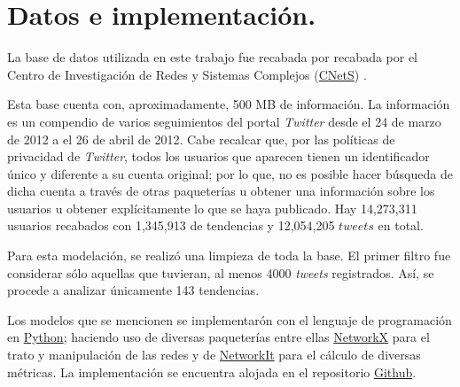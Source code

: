 \documentclass[../main.tex]{subfiles}
\begin{document}
\section{Datos e implementación.}

La base de datos utilizada en este trabajo fue recabada por recabada por el Centro de Investigación de Redes y Sistemas Complejos (\href{https://cnets.indiana.edu/about/}{CNetS}) \cite{D_Weng2013, D_weng2014predicting}.


Esta base cuenta con, aproximadamente, 500 MB de información. La información es un compendio de varios seguimientos del portal \textit{Twitter} desde el 24 de marzo de 2012 a el 26 de abril de 2012. Cabe recalcar que, por las políticas de privacidad de \textit{Twitter}, todos los usuarios que aparecen tienen un identificador único y diferente a su cuenta original; por lo que, no es posible hacer búsqueda de dicha cuenta a través de otras paqueterías u obtener una información sobre los usuarios u obtener explícitamente lo que se haya publicado. Hay 14,273,311 usuarios recabados con 1,345,913 de tendencias y 12,054,205 $tweets$ en total.

Para esta modelación, se realizó una limpieza de toda la base. El primer filtro fue considerar sólo aquellas que tuvieran, al menos 4000 \textit{tweets} registrados. Así, se procede a analizar únicamente 143 tendencias.

Los modelos que se mencionen se implementarón con el lenguaje de programación en \href{https://www.python.org/}{Python}; haciendo uso de diversas paqueterías entre ellas \href{https://networkx.org/}{NetworkX} para el trato y manipulación de las redes y de \href{https://networkit.github.io/}{NetworkIt} para el cálculo de diversas métricas. La implementación se encuentra alojada en el repositorio \href{https://github.com/ErickMM98/NetworkAnalysis_TwitterTrends}{Github}.
\end{document}
